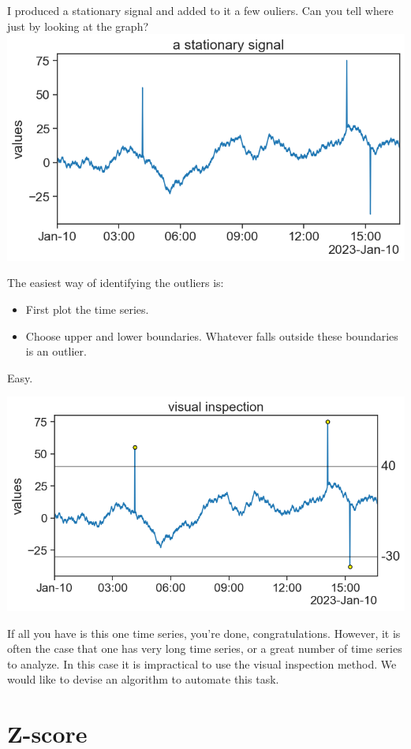 \documentclass[
  letterpaper,
  DIV=11,
  numbers=noendperiod,
  oneside]{scrreprt}
\providecommand{\tightlist}{%
  \setlength{\itemsep}{0pt}\setlength{\parskip}{0pt}}\usepackage{longtable,booktabs,array}
\begin{document}
I produced a stationary signal and added to it a few ouliers. Can you
tell where just by looking at the graph?
\includegraphics{outliers/signal_39_stationary.png}

The easiest way of identifying the outliers is:

\begin{itemize}
\tightlist
\item
  First plot the time series.
\item
  Choose upper and lower boundaries. Whatever falls outside these
  boundaries is an outlier.
\end{itemize}

Easy.

\includegraphics{outliers/outliers_visual_inspection.png}

If all you have is this one time series, you're done, congratulations.
However, it is often the case that one has very long time series, or a
great number of time series to analyze. In this case it is impractical
to use the visual inspection method. We would like to devise an
algorithm to automate this task.

\hypertarget{z-score}{%
\section{Z-score}\label{z-score}}
\end{document}
